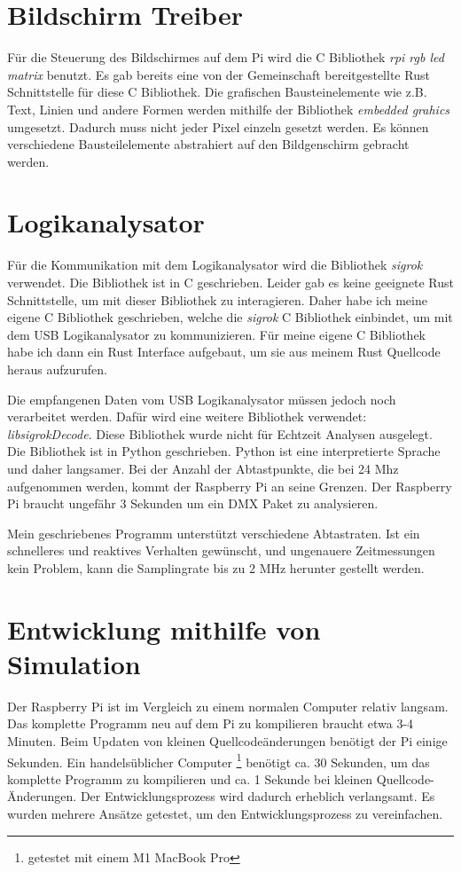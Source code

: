 \section{Bildschirm Treiber}

Für die Steuerung des Bildschirmes auf dem Pi wird die C Bibliothek \emph{rpi rgb led matrix} \cite{githubRpi-rgb-led-matrix} benutzt. Es gab bereits eine von der Gemeinschaft bereitgestellte Rust Schnittstelle für diese C Bibliothek. Die grafischen Bausteinelemente wie z.B. Text, Linien und andere Formen werden mithilfe der Bibliothek \emph{embedded grahics}
\cite{githubEmbedded-graphics}
umgesetzt. Dadurch muss nicht jeder Pixel einzeln gesetzt werden. Es können verschiedene Bausteilelemente abstrahiert auf den Bildgenschirm gebracht werden. 



\section{Logikanalysator}
Für die Kommunikation mit dem Logikanalysator wird die Bibliothek \emph{sigrok} \cite{githubLibsigrok} verwendet. Die Bibliothek ist in C geschrieben. Leider gab es keine geeignete Rust Schnittstelle, um mit dieser Bibliothek zu interagieren. Daher habe ich meine eigene C Bibliothek geschrieben, welche die \emph{sigrok} C Bibliothek einbindet, um mit dem USB Logikanalysator zu kommunizieren. Für meine eigene C Bibliothek habe ich dann ein Rust Interface aufgebaut, um sie aus meinem Rust Quellcode heraus aufzurufen.

Die empfangenen Daten vom USB Logikanalysator müssen jedoch noch verarbeitet werden. Dafür wird eine weitere Bibliothek verwendet: \emph{libsigrokDecode}\cite{githubLibsigrokDecode}.
Diese Bibliothek wurde nicht für Echtzeit Analysen ausgelegt. Die Bibliothek ist in Python geschrieben. Python ist eine interpretierte Sprache und daher langsamer. Bei der Anzahl der Abtastpunkte, die bei 24 Mhz aufgenommen werden, kommt der Raspberry Pi an seine Grenzen. Der Raspberry Pi braucht ungefähr 3 Sekunden um ein DMX Paket zu analysieren.

Mein geschriebenes Programm unterstützt verschiedene Abtastraten. Ist ein schnelleres und reaktives Verhalten gewünscht, und ungenauere Zeitmessungen kein Problem, kann die Samplingrate bis zu 2 MHz herunter gestellt werden.



\section{Entwicklung mithilfe von Simulation}
Der Raspberry Pi ist im Vergleich zu einem normalen Computer relativ langsam. Das komplette Programm neu auf dem Pi zu kompilieren braucht etwa 3-4 Minuten. Beim Updaten von kleinen Quellcodeänderungen benötigt der Pi einige Sekunden. Ein handelsüblicher Computer \footnote{getestet mit einem M1 MacBook Pro} benötigt ca. 30 Sekunden, um das komplette Programm zu kompilieren und ca. 1 Sekunde bei kleinen Quellcode-Änderungen. Der Entwicklungsprozess wird dadurch erheblich verlangsamt. Es wurden mehrere Ansätze getestet, um den Entwicklungsprozess zu vereinfachen.

